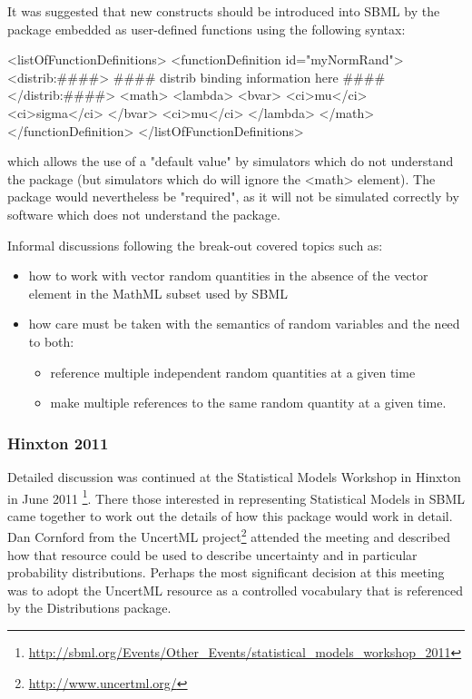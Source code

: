 \documentclass[draftspec]{sbmlpkgspec}
\newcommand{\distrib}{Distributions\xspace}
\newcommand{\uncertml}{UncertML\xspace}
\begin{document}
It was suggested that new constructs should be introduced into SBML by
the package embedded as user-defined functions using the following
syntax:

\begin{example}
<listOfFunctionDefinitions>
  <functionDefinition id="myNormRand">
    <distrib:####>
      #### distrib binding information here ####
    </distrib:####>
    <math>
      <lambda>
        <bvar>
          <ci>mu</ci>
          <ci>sigma</ci>
        </bvar>
        <ci>mu</ci>
      </lambda>
    </math>
  </functionDefinition>
</listOfFunctionDefinitions>
\end{example}

which allows the use of a "default value" by simulators which do not
understand the package (but simulators which do will ignore the <math>
element). The package would nevertheless be "required", as it will not
be simulated correctly by software which does not understand the
package.

Informal discussions following the break-out covered topics such as:

\begin{itemize}
\item how to work with vector random quantities in the absence of the vector
element in the MathML subset used by SBML
\item how care must be taken with the semantics of random variables
  and the need to both:
\begin{itemize}
\item reference multiple independent random quantities at a given
  time
\item make multiple references to the same random quantity at a given
time.
\end{itemize}
\end{itemize}

\subsubsection{Hinxton 2011}

Detailed discussion was continued at the Statistical Models Workshop
in Hinxton in June 2011%
\footnote{\url{http://sbml.org/Events/Other_Events/statistical_models_workshop_2011}}. There
those interested in representing Statistical Models in SBML came
together to work out the details of how this package would work in
detail. Dan Cornford from the \uncertml
project\footnote{\url{http://www.uncertml.org/}} attended the meeting
and described how that resource could be used to describe uncertainty
and in particular probability distributions. Perhaps the most
significant decision at this meeting was to adopt the \uncertml
resource as a controlled vocabulary that is referenced by the \distrib package.
\end{document}
